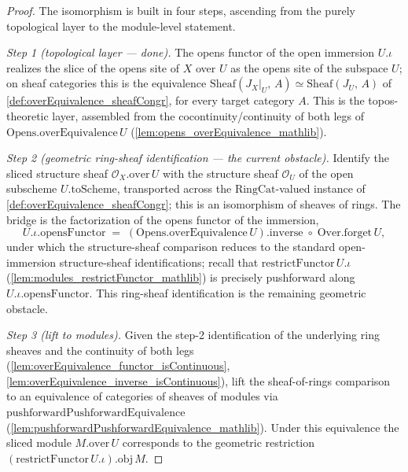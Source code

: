 \begin{proof}
  The isomorphism is built in four steps, ascending from the purely topological layer to the
  module-level statement.

  \emph{Step 1 (topological layer --- done).} The opens functor of the open immersion
  \(U.\iota\) realizes the slice of the opens site of \(X\) over \(U\) as the opens site of the
  subspace \(U\); on sheaf categories this is the equivalence
  \(\mathrm{Sheaf}(J_X|_U,\,A) \simeq \mathrm{Sheaf}(J_U,\,A)\) of
  \cref{def:overEquivalence_sheafCongr}, for every target category \(A\). This is the
  topos-theoretic layer, assembled from the cocontinuity/continuity of both legs of
  \(\mathrm{Opens.overEquivalence}\,U\) (\cref{lem:opens_overEquivalence_mathlib}).

  \emph{Step 2 (geometric ring-sheaf identification --- the current obstacle).} Identify the
  sliced structure sheaf \(\mathcal{O}_X.\mathrm{over}\,U\) with the structure sheaf
  \(\mathcal{O}_{U}\) of the open subscheme \(U.\mathrm{toScheme}\), transported across the
  \(\mathrm{RingCat}\)-valued instance of \cref{def:overEquivalence_sheafCongr}; this is an
  isomorphism of sheaves of rings. The bridge is the factorization of the opens functor of the
  immersion,
  \[
    U.\iota.\mathrm{opensFunctor}
      \;=\; (\mathrm{Opens.overEquivalence}\,U).\mathrm{inverse}
        \;\circ\; \mathrm{Over.forget}\,U ,
  \]
  under which the structure-sheaf comparison reduces to the standard open-immersion
  structure-sheaf identifications; recall that \(\mathrm{restrictFunctor}\,U.\iota\)
  (\cref{lem:modules_restrictFunctor_mathlib}) is precisely pushforward along
  \(U.\iota.\mathrm{opensFunctor}\). This ring-sheaf identification is the remaining geometric
  obstacle.

  \emph{Step 3 (lift to modules).} Given the step-2 identification of the underlying ring sheaves
  and the continuity of both legs (\cref{lem:overEquivalence_functor_isContinuous},
  \cref{lem:overEquivalence_inverse_isContinuous}), lift the sheaf-of-rings comparison to an
  equivalence of categories of sheaves of modules via
  \(\mathrm{pushforwardPushforwardEquivalence}\)
  (\cref{lem:pushforwardPushforwardEquivalence_mathlib}). Under this equivalence the sliced
  module \(M.\mathrm{over}\,U\) corresponds to the geometric restriction
  \((\mathrm{restrictFunctor}\,U.\iota).\mathrm{obj}\,M\).


\end{proof}
